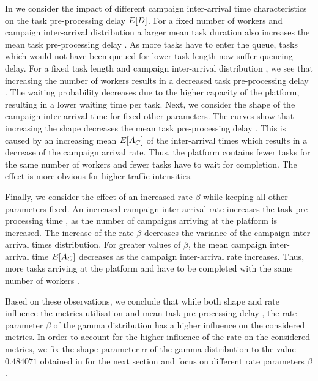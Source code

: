 In  we consider the impact of different campaign inter-arrival time characteristics \campaignIAT on the task pre-processing delay \(E[D]\).
For a fixed number of workers \numberOfWorkers and campaign inter-arrival distribution \campaignIAT a larger mean task duration \taskDuration also increases the mean task pre-processing delay \preTaskProcessingDelay.
As more tasks have to enter the queue, tasks which would not have been queued for lower task length now suffer queueing delay.
For a fixed task length \taskDuration and campaign inter-arrival distribution \campaignIAT, we see that increasing the number of workers \numberOfWorkers results in a decreased task pre-processing delay \preTaskProcessingDelay.
The waiting probability decreases due to the higher capacity of the platform, resulting in a lower waiting time per task.
Next, we consider the shape of the campaign inter-arrival time for fixed other parameters.
The curves show that increasing the shape decreases the mean task pre-processing delay \preTaskProcessingDelay.
This is caused by an increasing mean \(E[A_C]\) of the inter-arrival times which results in a decrease of the campaign arrival rate.
Thus, the platform contains fewer tasks for the same number of workers \numberOfWorkers and fewer tasks have to wait for completion.
The effect is more obvious for higher traffic intensities.

Finally, we consider the effect of an increased rate \(\beta\) while keeping all other parameters fixed.
An increased campaign inter-arrival rate increases the task pre-processing time \preTaskProcessingDelay, as the number of campaigns arriving at the platform is increased.
The increase of the rate \(\beta\) decreases the variance of the campaign inter-arrival times distribution.
For greater values of \(\beta\), the mean campaign inter-arrival time \(E[A_C]\) decreases as the campaign inter-arrival rate increases.
Thus, more tasks arriving at the platform and have to be completed with the same number of workers \numberOfWorkers.

Based on these observations, we conclude that while both shape and rate influence the metrics utilisation \workerUtilization and mean task pre-processing delay  \preTaskProcessingDelay, the rate parameter \(\beta\) of the gamma distribution has a higher influence on the considered metrics.
In order to account for the higher influence of the rate on the considered metrics, we fix the shape parameter \(\alpha\) of the gamma distribution to the value \(0.484071\) obtained in  for the next section and focus on different rate parameters \(\beta\).

